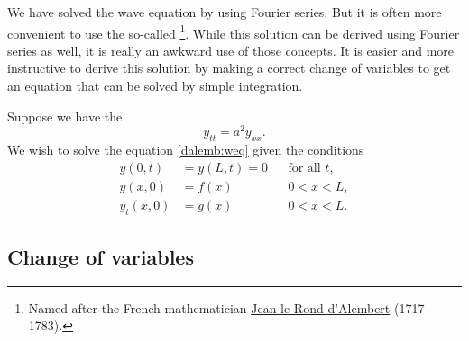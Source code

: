\documentclass[12pt]{book}
\begin{document}

We have solved the wave equation by using Fourier series.  But it is often
more convenient to use the so-called
\emph{}%
\footnote{Named after the French mathematician
\href{http://en.wikipedia.org/wiki/D\%27Alembert}{Jean le Rond d'Alembert}
(1717--1783).}.
While this solution can be derived using Fourier series as well, it
is really an awkward use of those concepts.  It is easier and more
instructive to derive this
solution by making a correct change of variables to get an equation that
can be solved by simple integration.

Suppose we have the 
\begin{equation} \label{dalemb:weq}
y_{tt} = a^2 y_{xx} .
\end{equation}
We wish to solve the equation \eqref{dalemb:weq} given the conditions
\begin{equation} \label{dalemb:weqside}
\begin{aligned}
y(0,t) &=  y(L,t) = 0 &
& \text{for all } t , \\
y(x,0) &= f(x) &  & 0 < x < L , \\
y_t(x,0) &= g(x) &  & 0 < x < L .
\end{aligned}
\end{equation}

\subsection{Change of variables}
\end{document}
